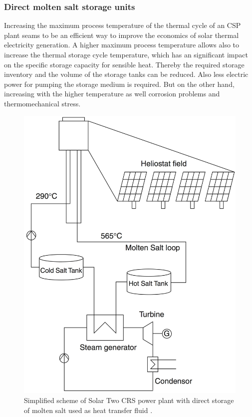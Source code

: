 \documentclass[Master,MEE,english]{twbook}%
\begin{document}
\subsubsection{Direct molten salt storage units}
Increasing the maximum process temperature of the thermal cycle of an CSP plant seams to be an efficient way to improve the economics of solar thermal electricity generation. A higher maximum process temperature allows also to increase the thermal storage cycle temperature, which has an significant impact on the specific storage capacity for sensible heat. Thereby the required storage inventory and the volume of the storage tanks can be reduced. Also less electric power for pumping the storage medium is required. But on the other hand, increasing with the higher temperature as well corrosion problems and thermomechanical stress.
\begin{figure}[t!]  
\centering
\includegraphics[width=0.45\linewidth]{FIG/towerdirecttwotank}
\caption[Simplified scheme of Solar Two CRS power plant with direct storage of molten salt used as heat transfer fluid.]{Simplified scheme of Solar Two CRS power plant with direct storage of molten salt used as heat transfer fluid \cite{Richter2013}.}\label{towerdirecttwotank}
\end{figure}
\\
\end{document}
